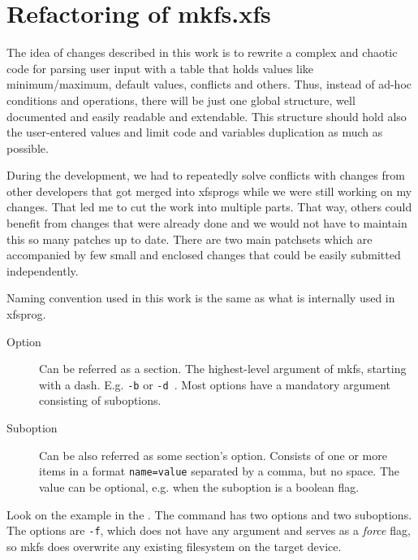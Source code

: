 
\chapter{Refactoring of mkfs.xfs} \label{chap:refactoring}

The idea of changes described in this work is to rewrite a complex and
chaotic code for parsing user input with a table that holds values like
minimum/maximum, default values, conflicts and others. Thus, instead of
ad-hoc conditions and operations, there will be just one global structure,
well documented and easily readable and extendable. This structure should
hold also the user-entered values and limit code and variables duplication
as much as possible.

During the development, we had to repeatedly solve conflicts with changes
from other developers that got merged into xfsprogs while we were still
working on my changes. That led me to cut the work into multiple parts.
That way, others could benefit from changes that were already done and we
would not have to maintain this so many patches up to date. There are two
main patchsets which are accompanied by few small and enclosed changes that
could be easily submitted independently.

Naming convention used in this work is the same as what is internally used
in xfsprog.
\begin{description}
\item[Option] Can be referred as a section. The highest-level argument of
	mkfs, starting with a dash.  E.g. {\tt -b} or {\tt -d }. Most
	options have a mandatory argument consisting of suboptions.
\item[Suboption] Can be also referred as some section's option. Consists
	of one or more items in a format {\tt name=value} separated by a
	comma, but no space. The value can be optional, e.g. when the
	suboption is a boolean flag.
\end{description}

Look on the example in the . The command has
two options and two suboptions. The options are {\tt -f}, which does not
have any argument and serves as a {\em force} flag, so mkfs does overwrite
any existing filesystem on the target device.


